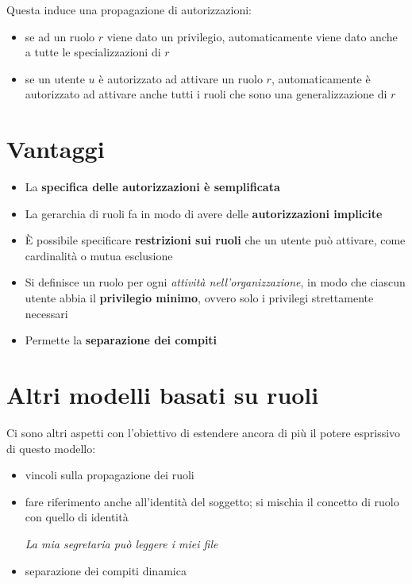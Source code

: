 \documentclass{report}
\begin{document}
\noindent Questa induce una propagazione di autorizzazioni:
\begin{itemize}
    \item se ad un ruolo $r$ viene dato un privilegio, automaticamente 
    viene dato anche a tutte le specializzazioni di $r$
    \item se un utente $u$ è autorizzato ad attivare un ruolo $r$, automaticamente
    è autorizzato ad attivare anche tutti i ruoli che sono una generalizzazione di $r$
\end{itemize}

\section{Vantaggi}
\begin{itemize}
    \item La \textbf{specifica delle autorizzazioni è semplificata}
    \item La gerarchia di ruoli fa in modo di avere delle \textbf{autorizzazioni implicite} 
    \item È possibile specificare \textbf{restrizioni sui ruoli} che un utente può attivare, come 
    cardinalità o mutua esclusione 
    \item Si definisce un ruolo per ogni \textit{attività nell'organizzazione}, in modo 
    che ciascun utente abbia il \textbf{privilegio minimo}, ovvero solo i privilegi strettamente 
    necessari 
    \item Permette la \textbf{separazione dei compiti}
\end{itemize}

\section{Altri modelli basati su ruoli}
Ci sono altri aspetti con l'obiettivo di estendere ancora di più 
il potere esprissivo di questo modello:
\begin{itemize}
    \item vincoli sulla propagazione dei ruoli 
    \item fare riferimento anche all'identità del soggetto; si mischia il concetto di ruolo 
    con quello di identità 

    \noindent \textit{La mia segretaria può leggere i miei file}
    \item separazione dei compiti dinamica
\end{itemize}
\end{document}
